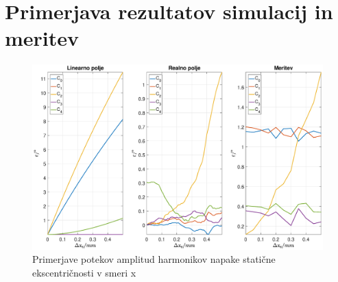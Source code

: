\chapter{Primerjava rezultatov simulacij in meritev}

\begin{figure}[ht]
	\centering
	\includegraphics[width=\columnwidth]{./Slike/primerjava_xs.eps}
	\caption{Primerjave potekov amplitud harmonikov napake  statične ekscentričnosti v smeri x}
	\label{primerjava_xs}
\end{figure}

